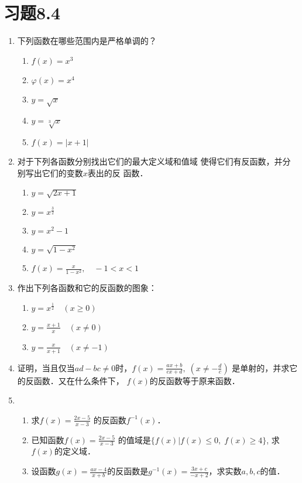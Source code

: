 \section*{习题8.4}
\begin{enumerate}
\item 下列函数在哪些范围内是严格单调的？
\begin{multicols}{2}
  \begin{enumerate}
    \item $f(x)=x^3$
    \item $\varphi(x)=x^4$
    \item $y=\sqrt{x}$
    \item $y=\sqrt[3]{x}$
    \item $f(x)=|x+1|$
\end{enumerate}  
\end{multicols}


\item 对于下列各函数分别找出它们的最大定义域和值域
使得它们有反函数，并分别写出它们的变数$x$表出的反
函数．
\begin{multicols}{2}
    \begin{enumerate}
      \item $y=\sqrt{2x+1}$
      \item $y=x^{\tfrac{3}{2}}$
      \item $y=x^2-1$
      \item $y=\sqrt{1-x^2}$
      \item $f(x)=\frac{x}{1-x^2},\quad -1<x<1$
  \end{enumerate}  
  \end{multicols}

\item 作出下列各函数和它的反函数的图象：
\begin{multicols}{2}
    \begin{enumerate}
      \item $y=x^{\tfrac{1}{2}}\quad (x\ge 0)$
      \item $y=\frac{x+1}{x}\quad (x\ne 0)$
      \item $y=\frac{x}{x+1}\quad (x\ne -1)$
  \end{enumerate}  
  \end{multicols}

\item 证明，当且仅当$ad-bc\ne 0$时，$f(x)=\frac{ax+b}{cx+d},\; \left(x\ne -\frac{d}{c}\right)$
是单射的，并求它的反函数．又在什么条件下，
$f(x)$的反函数等于原来函数．
\item \begin{enumerate}
\item 求$f(x)=\frac{2x-5}{x-3}$
的反函数$f^{-1}(x)$．
\item 已知函数$f(x)=\frac{2x-5}{x-3}$
的值域是$\{f(x)|f(x)\le 0,\; f(x)\ge 4\}$, 求$f(x)$的定义域．
\item 设函数$g(x)=\frac{ax-4}{x+b}$的反函数是$g^{-1}(x)=\frac{3x+c}{-x+2}$，求实数$a,b,c$的值．
\end{enumerate}


\end{enumerate}
